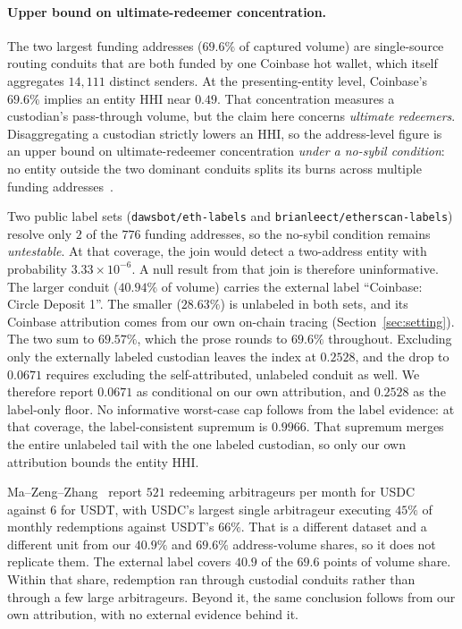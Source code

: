 \paragraph{Upper bound on ultimate-redeemer concentration.} The two largest funding addresses
($69.6\%$ of captured volume) are single-source routing conduits that are both funded by one
Coinbase hot wallet, which itself aggregates $14{,}111$ distinct senders. At the
presenting-entity level, Coinbase's $69.6\%$ implies an entity HHI near $0.49$. That
concentration measures a custodian's pass-through volume, but the claim here concerns
\emph{ultimate redeemers}. Disaggregating a custodian strictly lowers an HHI, so the
address-level figure is an upper bound on ultimate-redeemer concentration \emph{under a
no-sybil condition}: no entity outside the two dominant conduits splits its burns across
multiple funding addresses~\cite{Victor_2020}.

\begin{sloppypar}
Two public label sets (\texttt{dawsbot/eth-labels} and
\texttt{brianleect/etherscan-labels}) resolve only $2$ of the $776$ funding
addresses, so the no-sybil condition remains \emph{untestable}. At that coverage, the join
would detect a two-address entity with probability $3.33\times10^{-6}$. A null result from
that join is therefore uninformative. The larger conduit ($40.94\%$ of volume) carries the external label
``Coinbase: Circle Deposit 1''. The smaller ($28.63\%$) is unlabeled in both sets, and its
Coinbase attribution comes from our own on-chain tracing (Section~\ref{sec:setting}). The two sum to $69.57\%$, which the prose rounds to $69.6\%$
throughout. Excluding only the externally labeled custodian leaves the index at $0.2528$, and the
drop to $0.0671$ requires excluding the self-attributed, unlabeled conduit as well. We
therefore report $0.0671$ as conditional on our own attribution, and $0.2528$ as the
label-only floor. No informative worst-case cap follows from the label evidence: at that coverage, the
label-consistent supremum is $0.9966$. That supremum merges the entire unlabeled tail with the
one labeled custodian, so only our own attribution bounds the entity HHI.
\end{sloppypar}

Ma--Zeng--Zhang~\cite{mzz2025} report $521$ redeeming arbitrageurs per month for USDC
against $6$ for USDT, with USDC's largest single arbitrageur executing $45\%$ of monthly redemptions
against USDT's $66\%$. That is a different dataset and a different unit from our $40.9\%$ and
$69.6\%$ address-volume shares, so it does not replicate them. The
external label covers $40.9$ of the $69.6$ points of volume share. Within that share,
redemption ran through custodial conduits rather than through a few large arbitrageurs.
Beyond it, the same conclusion follows from our own attribution, with no external evidence
behind it.
